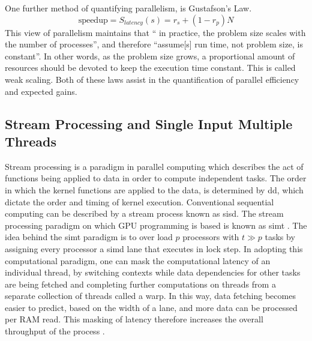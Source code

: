 One further method of quantifying parallelism, is Gustafson's Law\cite{Gustafson}.
%
\begin{equation}
  \tag{Gustofson's Law}
  \text{speedup} = S_{latency}(s) = r_{s} + (1 - r_{p})N
\end{equation}
%
This view of parallelism maintains that `` in practice, the problem
size scales with the number of processes'', and therefore
``assume[s] run time, not problem size, is constant''.
In other words, as the problem size grows, a proportional
amount of resources should be devoted to keep the execution time constant.  This
is called weak scaling.
Both of these laws assist in the quantification of parallel efficiency and
expected gains.

\subsection{Stream Processing and Single Input Multiple Threads}
Stream processing is a paradigm in parallel computing which describes the act
of functions being applied to data in order to compute independent tasks.
The order in which the kernel functions are applied to the data, is determined by
\gls{dd}, which dictate the order and timing of kernel execution. Conventional
sequential computing can be described by a stream process known as \gls{sisd}.
The stream processing paradigm on which GPU programming is based is known as \gls{simt}
 \cite{advancedtopics}.  The idea behind the \gls{simt} paradigm is to over load
 $p$ processors with $t \gg p$ tasks by assigning every processor a \gls{simd} lane
 that executes in lock step.  In adopting this computational paradigm, one can mask
 the computational latency of an individual thread, by switching contexts while
 data dependencies for other tasks are being fetched and
 completing further computations on threads from a separate collection of threads called a warp.  In this way,
 data fetching becomes easier to predict, based on the width of a lane, and more
 data can be processed per \gls{RAM} read.   This masking of latency therefore increases
 the overall throughput of the process \cite{advancedtopics}.


